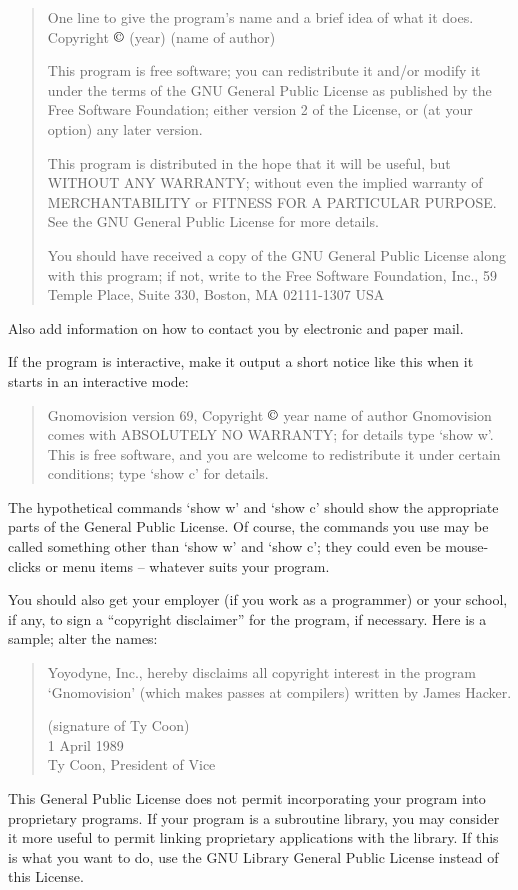 \documentclass[oneside,english]{book}
\begin{document}
\begin{quote}
One line to give the program's name and a brief idea of what it does.
Copyright {\footnotesize $\copyright$ (}year) (name of author)

This program is free software; you can redistribute it and/or modify
it under the terms of the GNU General Public License as published
by the Free Software Foundation; either version 2 of the License,
or (at your option) any later version.

This program is distributed in the hope that it will be useful, but
WITHOUT ANY WARRANTY; without even the implied warranty of MERCHANTABILITY
or FITNESS FOR A PARTICULAR PURPOSE. See the GNU General Public License
for more details.

You should have received a copy of the GNU General Public License
along with this program; if not, write to the Free Software Foundation,
Inc., 59 Temple Place, Suite 330, Boston, MA 02111-1307 USA
\end{quote}
Also add information on how to contact you by electronic and paper
mail.

If the program is interactive, make it output a short notice like
this when it starts in an interactive mode:

\begin{quote}
Gnomovision version 69, Copyright $\copyright$ year name of author Gnomovision
comes with ABSOLUTELY NO WARRANTY; for details type `show w'. This
is free software, and you are welcome to redistribute it under certain
conditions; type `show c' for details.
\end{quote}
The hypothetical commands `show w' and `show c' should show the appropriate
parts of the General Public License. Of course, the commands you use
may be called something other than `show w' and `show c'; they could
even be mouse-clicks or menu items -- whatever suits your program.

You should also get your employer (if you work as a programmer) or
your school, if any, to sign a ``copyright disclaimer'' for the program,
if necessary. Here is a sample; alter the names:

\begin{quote}
Yoyodyne, Inc., hereby disclaims all copyright interest in the program
`Gnomovision' (which makes passes at compilers) written by James Hacker.

(signature of Ty Coon)\\
1 April 1989 \\
Ty Coon, President of Vice
\end{quote}
This General Public License does not permit incorporating your program
into proprietary programs. If your program is a subroutine library,
you may consider it more useful to permit linking proprietary applications
with the library. If this is what you want to do, use the GNU Library
General Public License instead of this License.
\end{document}
